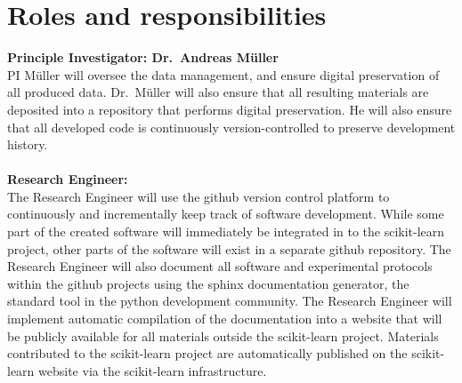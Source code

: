 











%

\section{Roles and responsibilities}

\textbf{Principle Investigator: Dr.\ Andreas M\"uller}\\
PI M\"uller will oversee the data management, and ensure digital preservation of
all produced data. Dr.\ M\"uller will also ensure that all resulting materials
are deposited into a repository that performs digital preservation.
He will also ensure that all developed code is continuously version-controlled to
preserve development history.
\\\\
\textbf{Research Engineer:}\\
The Research Engineer will use the github version control platform to
continuously and incrementally keep track of software development. While some
part of the created software will immediately be integrated in to the
scikit-learn project, other parts of the software will exist in a separate
github repository. The Research Engineer will also document all software and
experimental protocols within the github projects using the sphinx
documentation generator, the standard tool in the python development community.
The Research Engineer will implement automatic compilation of the documentation
into a website that will be publicly available for all materials outside the scikit-learn
project. Materials contributed to the scikit-learn project are automatically
published on the scikit-learn website via the scikit-learn infrastructure.


